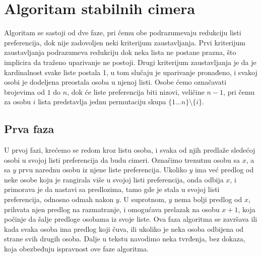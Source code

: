 \documentclass[a4paper]{article}
\begin{document}
\newpage

\section{Algoritam stabilnih cimera}
\label{sec:naslov1}

Algoritam se sastoji od dve faze, pri čemu obe podrazumevaju redukciju listi preferencija, dok nije zadovoljen neki kriterijum zaustavljanja. Prvi kriterijum zaustavljanja podrazumeva redukciju dok neka lista ne postane prazna, što implicira da traženo uparivanje ne postoji. Drugi kriterijum zaustavljanja je da je kardinalnost svake liste postala 1, u tom slučaju je uparivanje pronađeno, i svakoj osobi je dodeljena preostala osoba u njenoj listi. Osobe ćemo označavati brojevima od $1$ do $n$, dok će liste preferencija biti nizovi, veličine $n-1$, pri čemu za osobu $i$ lista predstavlja jednu permutaciju skupa $\{1 \ldots n\} \setminus \{i\}$.  


\subsection{Prva faza}

U prvoj fazi, krećemo se redom kroz listu osoba, i svaka od njih predlaže sledećoj osobi u svojoj listi preferencija da budu cimeri. Označimo trenutnu osobu sa $x$, a sa $y$ prvu narednu osobu iz njene liste preferencija. Ukoliko $y$ ima već predlog od neke osobe koju je rangirala više u svojoj listi preferencija, onda odbija $x$, i primorava je da nastavi sa predlozima, tamo gde je stala u svojoj listi preferencija, odnosno odmah nakon $y$. U suprotnom, $y$ nema bolji predlog od $x$, prihvata njen predlog na razmatranje, i omogućava prelazak na osobu $x+1$, koja počinje da šalje predloge osobama iz svoje liste.
\newline
Ova faza algoritma se završava ili kada svaka osoba ima predlog koji čuva, ili ukoliko je neka osoba odbijena od strane svih drugih osoba. 
\newline
Dalje u tekstu navodimo neka tvrđenja, bez dokaza, koja obezbeđuju ispravnost ove faze algoritma.
\end{document}
